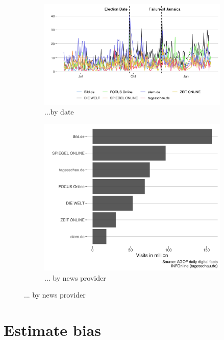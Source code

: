 \documentclass[12pt,a4paper,notitlepage]{article}
\begin{document}
\begin{figure}[H]
	\caption{Article distribution...}
	\begin{center}
		\begin{subfigure}[normla]{0.59\textwidth}
			\includegraphics[width=\textwidth]{../figs/article_timeline.png}
			\caption{...by date}
			\label{fig_distr1}
		\end{subfigure}
		\begin{subfigure}[normla]{0.4\textwidth}
			\includegraphics[width=\textwidth]{../figs/visits.png}
			\caption{... by news provider}
			\label{fig_distr2}
		\end{subfigure}
	\end{center}
\end{figure}

\section{Estimate bias}
\end{document}
